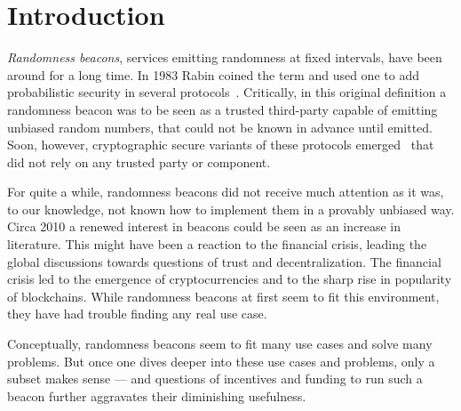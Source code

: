 \section{Introduction}

\emph{Randomness beacons}, services emitting randomness at fixed intervals, have been around for a long time.
In 1983 Rabin coined the term and used one to add probabilistic security in several protocols~.
Critically, in this original definition a randomness beacon was to be seen as a trusted third-party capable of emitting unbiased random numbers, that could not be known in advance until emitted.
Soon, however, cryptographic secure variants of these protocols emerged~ that did not rely on any trusted party or component.

For quite a while, randomness beacons did not receive much attention as it was, to our knowledge, not known how to implement them in a provably unbiased way.
Circa 2010 a renewed interest in beacons could be seen as an increase in literature.
This might have been a reaction to the financial crisis, leading the global discussions towards questions of trust and decentralization.
The financial crisis led to the emergence of cryptocurrencies and to the sharp rise in popularity of blockchains.
While randomness beacons at first seem to fit this environment, they have had trouble finding any real use case.

Conceptually, randomness beacons seem to fit many use cases and solve many problems.
But once one dives deeper into these use cases and problems, only a subset makes sense --- and questions of incentives and funding to run such a beacon further aggravates their diminishing usefulness.


